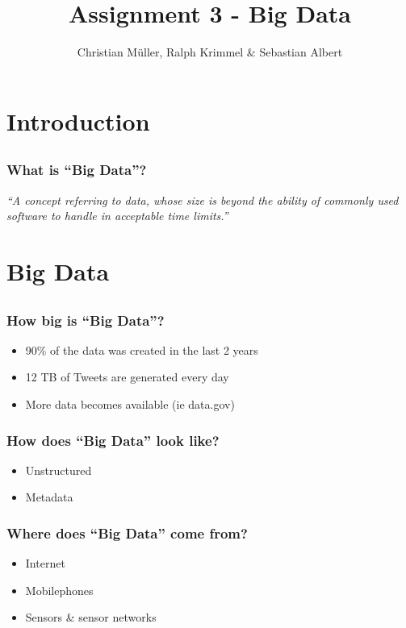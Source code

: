 \documentclass{beamer}
\title{Assignment 3 - Big Data}
\author{Christian Müller, Ralph Krimmel \& Sebastian Albert}
\begin{document}

\section*{Introduction}
\subsection*{}
\begin{frame}
	\maketitle
\end{frame}

\begin{frame}
	\frametitle{What is ``Big Data''?}
		\huge
		\textsl{``A concept referring to data,
		whose size is beyond the ability of commonly used software to handle in acceptable time limits.''}
\end{frame}

\section{Big Data}
\subsection*{}
\begin{frame}
	\frametitle{How big is ``Big Data''?}
		\begin{itemize}
			\item 90\% of the data was created in the last 2 years
			\item 12 TB of Tweets are generated every day
			\item More data becomes available (ie data.gov)
		\end{itemize}
\end{frame}

\begin{frame}
	\frametitle{How does ``Big Data'' look like?}
	\begin{itemize}
		\item Unstructured
		\item Metadata
	\end{itemize}
\end{frame}

\begin{frame}
	\frametitle{Where does ``Big Data'' come from?}
	\begin{itemize}
		\item Internet
		\item Mobilephones
		\item Sensors \& sensor networks
	\end{itemize}
\end{frame}
\end{document}
